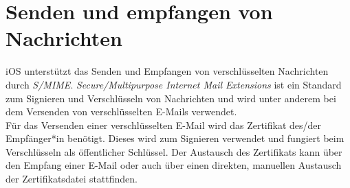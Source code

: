 \section{Senden und empfangen von Nachrichten}

iOS unterstützt das Senden und Empfangen von verschlüsselten Nachrichten durch \textit{S/MIME}. \textit{Secure/Multipurpose Internet Mail Extensions} ist ein Standard zum Signieren und Verschlüsseln von Nachrichten und wird unter anderem bei dem Versenden von verschlüsselten E-Mails verwendet. \\
Für das Versenden einer verschlüsselten E-Mail wird das Zertifikat des/der Empfänger*in benötigt. Dieses wird zum Signieren verwendet und fungiert beim Verschlüsseln als öffentlicher Schlüssel.
Der Austausch des Zertifikats kann über den Empfang einer E-Mail oder auch über einen direkten, manuellen Austausch der Zertifikatsdatei stattfinden.